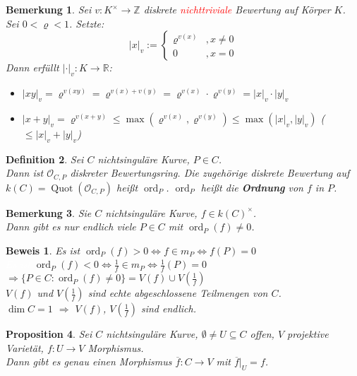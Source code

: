 \documentclass[a4paper,12pt]{report}
\theoremstyle{break}
\newtheorem{Def}{Definition}[section]
\newtheorem{Bem}[Def]{Bemerkung}
\newtheorem{Prop}[Def]{Proposition}
\theoremstyle{nonumberbreak}
\newtheorem{Bew}{Beweis}
\theoremstyle{nonumberplain}
\newcommand{\emp}[1]{\textbf{\emph{#1}}}
\newcommand{\begriff}[1]{{\index{#1}}\emp{#1}}
\DeclareMathOperator{\Quot}{Quot}
\DeclareMathOperator{\ord}{ord}
\newcommand{\R}{\mathbb{R}}
\newcommand{\Z}{\mathbb{Z}}
\newcommand{\calO}{\mathcal{O}}
\newcommand{\X}{\times}
\begin{document}
\begin{Bem}
Sei $v:K^\X\to\Z$ diskrete \textcolor{red}{nichttriviale} Bewertung auf K\"orper $K$. Sei $0<\varrho<1$. Setzte:
	\[|x|_v:=\left\{\begin{array}{lr}\varrho^{v(x)} & ,x\ne 0\\0 & ,x=0\end{array}\right.\]
Dann erf\"ullt $|\cdot|_v:K\to\R$:\begin{itemize}
\item$|xy|_v=\varrho^{v(xy)}=\varrho^{v(x)+v(y)}=\varrho^{v(x)}\cdot\varrho^{v(y)}=|x|_v\cdot|y|_v$
\item$|x+y|_v=\varrho^{v(x+y)}\le\max(\varrho^{v(x)},\varrho^{v(y)})\le\max(|x|_v,|y|_v)$ ($\le|x|_v+|y|_v$)
\end{itemize}\end{Bem}

\begin{Def}
Sei $C$ nichtsingul\"are Kurve, $P\in C$.\\
Dann ist $\calO_{C,P}$ diskreter Bewertungsring. Die zugeh\"orige diskrete Bewertung auf $k(C)=\Quot(\calO_{C,P})$ hei\ss t $\ord_P$. $\ord_P$ hei\ss t die \begriff{Ordnung} von $f$ in $P$.
\end{Def}

\begin{Bem}\label{20.8}
Sie $C$ nichtsingul\"are Kurve, $f\in k(C)^\X$.\\
Dann gibt es nur endlich viele $P\in C$ mit $\ord_P(f)\ne0$.
\end{Bem}

\begin{Bew}
Es ist $\ord_P(f) > 0 \Leftrightarrow f \in m_P \Leftrightarrow f(P)=0$\\
\textcolor{white}{Es ist} $\ord_P(f) < 0 \Leftrightarrow \frac{1}{f} \in m_P \Leftrightarrow \frac{1}{f}(P)=0$\\
$\Rightarrow \{P\in C: \ord_P(f)\ne0\} = V(f)\cup V(\frac{1}{f})$\\
$V(f)$ und $V(\frac{1}{f})$ sind echte abgeschlossene Teilmengen von $C$.\\
$\dim C=1$ $\Rightarrow$ $V(f)$, $V(\frac{1}{f})$ sind endlich.
\end{Bew}

\begin{Prop}\label{20.9}
Sei $C$ nichtsingul\"are Kurve, $\emptyset\ne U\subseteq C$ offen, $V$ projektive Variet\"at, $f:U\to V$ Morphismus.\\
Dann gibt es genau einen Morphismus $\overline{f}:C\to V$ mit $\overline{f}|_U=f$.
\end{Prop}
\end{document}
